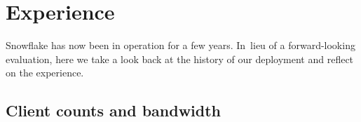 \documentclass[letterpaper,twocolumn]{article}
\begin{document}
\begin{figure}[t]
{%
}
\label{fig:client-counts}
\end{figure}

\section{Experience}
\label{sec:experience}

Snowflake has now been in operation for a few years.
In~lieu of a forward-looking evaluation,
here we take a look back
at the history of our deployment
and reflect on the experience.

\subsection{Client counts and bandwidth}
\label{sec:clients}
\end{document}
